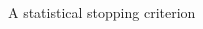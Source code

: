 \documentclass[9pt,aspectratio=169]{beamer}
\begin{document}
\begin{frame}{A statistical stopping criterion}



\begin{columns}
	
	\begin{column}{0.382\linewidth}
		\begin{figure}
			

\end{figure}
\end{column}
\end{columns}
\end{frame}
\end{document}
